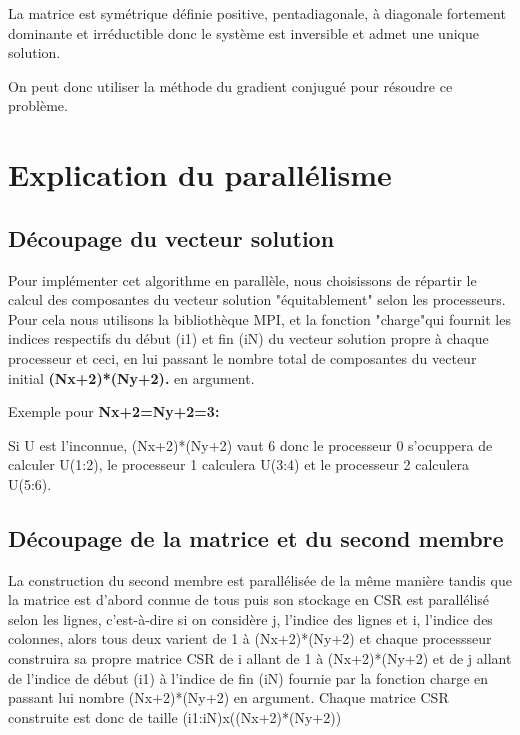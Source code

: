 \documentclass[a4paper,12pt,twoside]{report}
\begin{document}
La matrice est symétrique définie positive, pentadiagonale, à diagonale fortement dominante et irréductible donc le système est inversible et  admet une unique solution.

On peut donc utiliser la méthode du gradient conjugué pour résoudre ce problème.





\chapter{Explication du parallélisme}

{\section{
\textbf{Découpage du vecteur solution}}}

Pour implémenter cet algorithme en parallèle, nous choisissons de répartir le calcul des composantes  du vecteur solution "équitablement" selon les processeurs. Pour cela nous utilisons la bibliothèque MPI, et la fonction "charge"qui fournit les indices respectifs du début (i1) et fin (iN) du vecteur solution propre à chaque processeur et ceci, en lui passant le nombre total de composantes du vecteur initial \textbf{(Nx+2)*(Ny+2).} en argument.

Exemple pour \textbf{Nx+2=Ny+2=3:}

Si U est l'inconnue, (Nx+2)*(Ny+2) vaut 6 donc le processeur 0 s'ocuppera de calculer U(1:2), le processeur 1 calculera U(3:4) et le processeur 2 calculera U(5:6).










\section{\textbf{Découpage de la matrice et du second membre}
}
La construction du second membre est parallélisée de la même manière tandis que la matrice est d'abord connue de tous puis son stockage en CSR est parallélisé selon les lignes, c'est-à-dire 
si on considère j, l'indice des lignes et i, l'indice des colonnes, alors tous deux varient de 1 à (Nx+2)*(Ny+2) et chaque processseur construira sa propre matrice CSR de i allant de 1 à (Nx+2)*(Ny+2) et  de j allant de l'indice de début (i1) à l'indice de  fin (iN) fournie par la fonction charge en passant lui nombre (Nx+2)*(Ny+2) en argument. Chaque matrice CSR construite est donc de taille (i1:iN)x((Nx+2)*(Ny+2))
\end{document}
